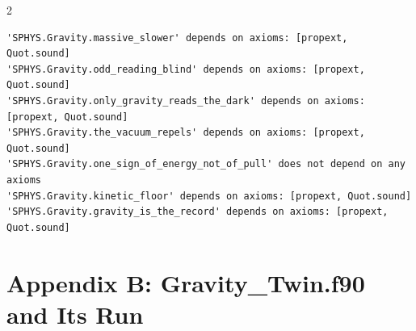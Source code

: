 \documentclass[10pt]{article}
\begin{document}
\begin{multicols}{2}
\begin{Verbatim}[fontsize=\fontsize{5.9}{6.8}\selectfont,breaklines,breakanywhere,breaksymbolleft={}]
'SPHYS.Gravity.massive_slower' depends on axioms: [propext, Quot.sound]
'SPHYS.Gravity.odd_reading_blind' depends on axioms: [propext, Quot.sound]
'SPHYS.Gravity.only_gravity_reads_the_dark' depends on axioms: [propext, Quot.sound]
'SPHYS.Gravity.the_vacuum_repels' depends on axioms: [propext, Quot.sound]
'SPHYS.Gravity.one_sign_of_energy_not_of_pull' does not depend on any axioms
'SPHYS.Gravity.kinetic_floor' depends on axioms: [propext, Quot.sound]
'SPHYS.Gravity.gravity_is_the_record' depends on axioms: [propext, Quot.sound]
\end{Verbatim}
\end{multicols}

\hypertarget{appendix-b-gravity_twin.f90-and-its-run}{%
\section{Appendix B: Gravity\_Twin.f90 and Its
Run}\label{appendix-b-gravity_twin.f90-and-its-run}}
\end{document}
